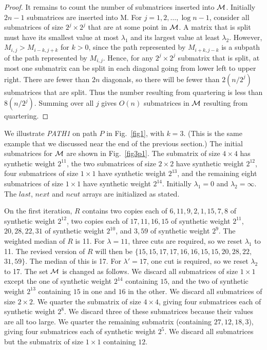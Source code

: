 {{{\begin{proof}
It remains to count the number of submatrices inserted into $\cal M$.
Initially $2n-1$ submatrices are inserted into M. 
For $j = 1, 2, \ldots ,\log n -1$,
consider all submatrices of size $2^j \times 2^j$ that are at some point in $\cal M$. 
A matrix that is split must have its smallest value at most $\lambda_1$ and its largest value at
least $\lambda_2$. However, $M_{i,j} > M_{i-k,j+k}$ for $k > 0$, since the path represented
by $M_{i+k,j-k}$ is a subpath of the path represented by $M_{i,j}$. Hence, for any $2^j\times 2^j$
submatrix that is split, at most one submatrix can be split
in each diagonal going from lower left to upper right. There are fewer than
$2n$ diagonals, so there will be fewer than $2(n/2^j)$ submatrices that are split.
Thus the number resulting from quartering is less than $8(n/2^j)$. Summing
over all $j$ gives $O(n)$ submatrices in $\cal M$ resulting from quartering.
\end{proof}

We illustrate {\it PATH1} on path $P$ in Fig.~\ref{fig1}, with $k=3$.
(This is the same example that we discussed near the end of the previous section.)
The initial submatrices for ${\cal M}$ are shown in Fig.~\ref{fig3p1}.
The submatrix of size $4 \times 4$ has synthetic weight $2^{11}$,
the two submatrices of size $2 \times 2$ have synthetic weight $2^{12}$,
four submatrices of size $1 \times 1$ have synthetic weight $2^{13}$,
and the remaining eight submatrices of size $1 \times 1$ have synthetic weight $2^{14}$.
Initially $\lambda_1 = 0$ and $\lambda_2 = \infty$.
The $last$, $next$ and $ncut$ arrays are initialized as stated.

On the first iteration,
$R$ contains two copies each of
$6,11,9,2,1,15,7,8$ of synthetic weight $2^{12}$,
two copies each of $17,11,16,15$ of synthetic weight $2^{11}$,
$20,28,22,31$ of synthetic weight $2^{10}$,
and $3,59$ of synthetic weight $2^{9}$.
The weighted median of $R$ is 11. 
For $\lambda = 11$, three cuts are required, so we reset $\lambda_1$ to 11.
The revised version of $R$ will then be
$\{15,15,17,17,16,16,15,15,20,28,22,$ $31,59\}$.
The median of this is 17.
For $\lambda '= 17$, one cut is required, so we reset $\lambda_2$ to 17.
The set $\cal M$ is changed as follows. 
We discard all submatrices of size $1 \times 1$ except the one of synthetic weight $2^{14}$ containing $15$, and the two of synthetic weight $2^{13}$ containing $15$ in one and $16$ in the other.
We discard all submatrices of size $2 \times 2$.
We quarter the submatrix of size $4 \times 4$, giving four submatrices each of synthetic weight $2^8$.
We discard three of these submatrices because their values are all too large.
We quarter the remaining submatrix (containing $27,12,18,3$), giving four submatrices each of synthetic weight $2^5$.
We discard all submatrices but the submatrix of size $1 \times 1$ containing $12$.

}}}
